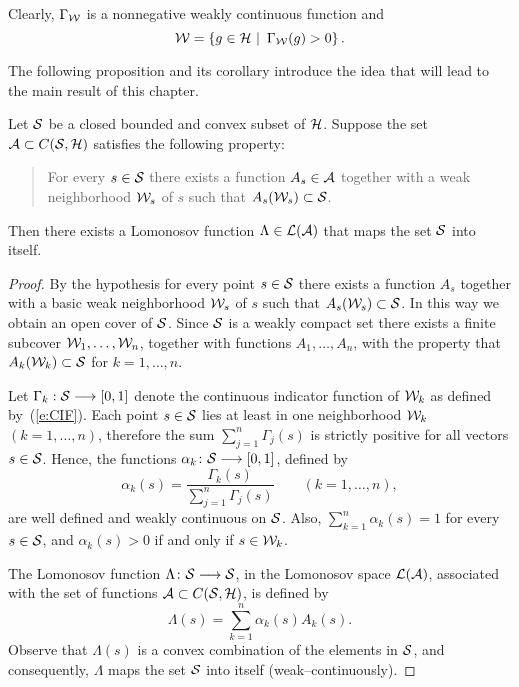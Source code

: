 \medskip

\begin{rem}
Clearly, $\Gamma_{\cal W}$ is a nonnegative weakly continuous
function and
\[ {\cal W} = \left\{g\in{\cal H}\,\,|\,\,\,\Gamma_{\cal W}(g)>0\right\}. \]
\end{rem}

\bigskip

The following proposition and its corollary introduce the idea
that will lead to the main result of this chapter.

\medskip

\goodbreak
\newpage

\begin{prop} \label{p:wAPPROX}
Let ${\cal S}$ be a closed bounded and convex subset of ${\cal H}$. Suppose
the set ${\cal A}\subset{}C({\cal S},{\cal H})$ satisfies the following property:
\begin{quote}
{For every $s\in{\cal S}$ there exists a function $A_s\in{\cal A}$ together
with a weak neighborhood ${\cal W}_s$ of $s$ such that
$A_s({\cal W}_s)\subset{\cal S}$.}
\end{quote}
Then there exists a Lomonosov function $\Lambda\in\cal{L}({\cal A})$
that maps the set ${\cal S}$ into itself.
\end{prop}

\begin{proof}
By the hypothesis for every point $s\in{\cal S}$ there exists a
function $A_s$ together with a basic weak neighborhood ${\cal W}_s$
of $s$ such that $A_s({\cal W}_s)\subset{\cal S}$. In this way we obtain an
open cover of ${\cal S}$. Since ${\cal S}$ is a weakly compact set there
exists a finite subcover ${\cal W}_1,\ldots,{\cal W}_n$, together with
functions $A_1,\ldots,A_n$, with the property that
$A_k({\cal W}_k)\subset{\cal S}$ for $k=1,\ldots,n$.

Let $\Gamma_k:{\cal S}\longrightarrow[0,1]$ denote the continuous indicator
function of ${\cal W}_k$ as defined by~(\ref{e:CIF}). Each point
$s\in{\cal S}$ lies at least in one neighborhood ${\cal W}_k$
$(k=1,\ldots,n)$, therefore the sum $\sum_{j=1}^n\Gamma_j(s)$
is strictly positive for all vectors $s\in{\cal S}$. Hence, the
functions $\alpha_k\colon{\cal S}\longrightarrow[0,1]$, defined by
\[ \alpha_k(s) =
   \frac{\Gamma_k(s)}{\sum_{j=1}^n \Gamma_j(s)}
   \quad\quad   (k=1,\ldots,n), \]
are well defined and weakly continuous on ${\cal S}$. Also,
$\sum_{k=1}^n\alpha_k(s)=1$ for every $s\in{\cal S}$, and
$\alpha_k(s)>0$ if and only if $s\in{\cal W}_k$.

\smallskip

The Lomonosov function $\Lambda\colon{\cal S}\longrightarrow{\cal S}$, in the Lomonosov
space $\cal{L}({\cal A})$, associated with the set of functions
${\cal A}\subset{}C({\cal S},{\cal H})$, is defined by
\[ \Lambda(s) = \sum_{k=1}^n \alpha_k(s) A_k(s). \]
Observe that $\Lambda(s)$ is a convex combination of the
elements in ${\cal S}$, and consequently, $\Lambda$ maps the set ${\cal S}$
into itself (weak--continuously).
\end{proof}

